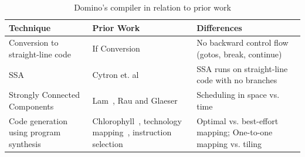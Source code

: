 \begin{table}[!t]
  \begin{scriptsize}
    \begin{tabular}{|p{}|p{}|p{}|}
  \hline
  Technique & Prior Work & Differences \\
  \hline
  Conversion to straight-line code & If Conversion~\cite{if_conversion} & No backward control flow (gotos, break, continue) \\
  \hline
  SSA & Cytron et. al~\cite{ssa} & SSA runs on straight-line code with no branches \\
  \hline
  Strongly Connected Components & Lam~\cite{software_pipelining}, Rau and Glaeser~\cite{rau} & Scheduling in space vs. time \\
  \hline
  Code generation using program synthesis & Chlorophyll~\cite{chlorophyll}, technology mapping~\cite{micheli, flowmap, spectransform}, instruction selection~\cite{muchnik} & Optimal vs. best-effort mapping; One-to-one mapping vs. tiling \\
  \hline
  \end{tabular}
  \end{scriptsize}
  \caption{Domino's compiler in relation to prior work}
  \label{tab:prior_compiler}
\end{table}


